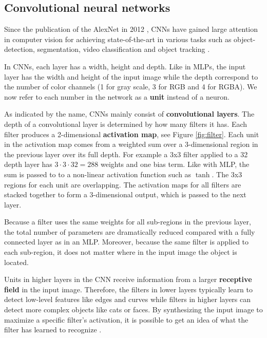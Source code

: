 \subsection{Convolutional neural networks}

Since the publication of the AlexNet in 2012 \cite{AlexNet}, CNNs have gained large attention in computer vision for achieving state-of-the-art in various tasks such as object-detection, segmentation, video classification and object tracking \cite{InceptionV3}.




In CNNs, each layer has a width, height and depth. Like in MLPs, the input layer has the width and height of the input image while the depth correspond to the number of color channels (1 for gray scale, 3 for RGB and 4 for RGBA). We now refer to each number in the network as a \textbf{unit} instead of a neuron.

As indicated by the name, CNNs mainly consist of \textbf{convolutional layers}. The depth of a convolutional layer is determined by how many filters it has. Each filter produces a 2-dimensional \textbf{activation map}, see Figure \ref{fig:filter}. Each unit in the activation map comes from a weighted sum over a 3-dimensional region in the previous layer over its full depth. For example a 3x3 filter applied to a 32 depth layer has $3 \cdot 3 \cdot 32=288$ weights and one bias term.
Like with MLP, the sum is passed to to a non-linear activation function such as $\tanh$. The 3x3 regions for each unit are overlapping.
The activation maps for all filters are stacked together to form a 3-dimensional output, which is passed to the next layer.

Because a filter uses the same weights for all sub-regions in the previous layer, the total number of parameters are dramatically reduced compared with a fully connected layer as in an MLP. Moreover, because the same filter is applied to each sub-region, it does not matter where in the input image the object is located.

Units in higher layers in the CNN receive information from a larger \textbf{receptive field} in the input image. Therefore, the filters in lower layers typically learn to detect low-level features like edges and curves while filters in higher layers can detect more complex objects like cats or faces.
By synthesizing the input image to maximize a specific filter's activation, it is possible to get an idea of what the filter has learned to recognize \cite{VisualizeCnn}.

